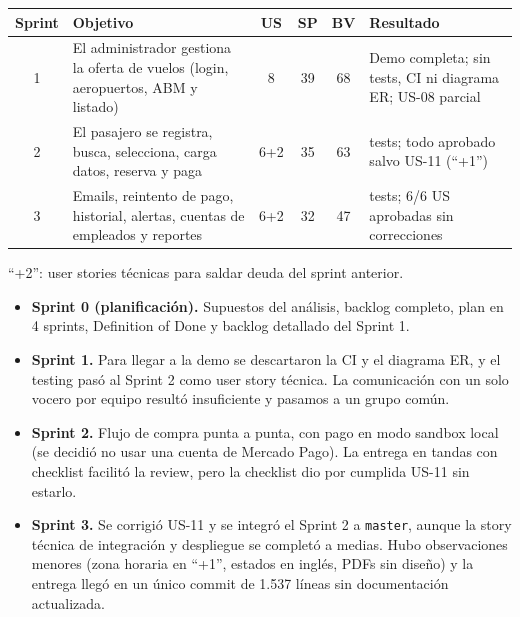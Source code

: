 \documentclass[11pt,a4paper]{article}
\begin{document}
\begin{center}
\small
\begin{tabularx}{\linewidth}{@{}c >{\raggedright\arraybackslash}X c c c >{\raggedright\arraybackslash}X@{}}
\toprule
\textbf{Sprint} & \textbf{Objetivo} & \textbf{US} & \textbf{SP} & \textbf{BV} & \textbf{Resultado} \\
\midrule
1 & El administrador gestiona la oferta de vuelos (login, aeropuertos, ABM y listado) & 8 & 39 & 68 & Demo completa; sin tests, CI ni diagrama ER; US-08 parcial \\
2 & El pasajero se registra, busca, selecciona, carga datos, reserva y paga & 6+2 & 35 & 63 & 64 tests; todo aprobado salvo US-11 (``+1'') \\
3 & Emails, reintento de pago, historial, alertas, cuentas de empleados y reportes & 6+2 & 32 & 47 & 71 tests; 6/6 US aprobadas sin correcciones \\
\bottomrule
\end{tabularx}
\end{center}
{\footnotesize\color{gris} ``+2'': user stories técnicas para saldar deuda del sprint anterior.}

\begin{itemize}
  \item \textbf{Sprint 0 (planificación).} Supuestos del análisis, backlog completo, plan en 4 sprints, Definition of Done y backlog detallado del Sprint 1.
  \item \textbf{Sprint 1.} Para llegar a la demo se descartaron la CI y el diagrama ER, y el testing pasó al Sprint 2 como user story técnica. La comunicación con un solo vocero por equipo resultó insuficiente y pasamos a un grupo común.
  \item \textbf{Sprint 2.} Flujo de compra punta a punta, con pago en modo sandbox local (se decidió no usar una cuenta de Mercado Pago). La entrega en tandas con checklist facilitó la review, pero la checklist dio por cumplida US-11 sin estarlo.
  \item \textbf{Sprint 3.} Se corrigió US-11 y se integró el Sprint 2 a \texttt{master}, aunque la story técnica de integración y despliegue se completó a medias. Hubo observaciones menores (zona horaria en ``+1'', estados en inglés, PDFs sin diseño) y la entrega llegó en un único commit de 1.537 líneas sin documentación actualizada.
\end{itemize}
\end{document}
